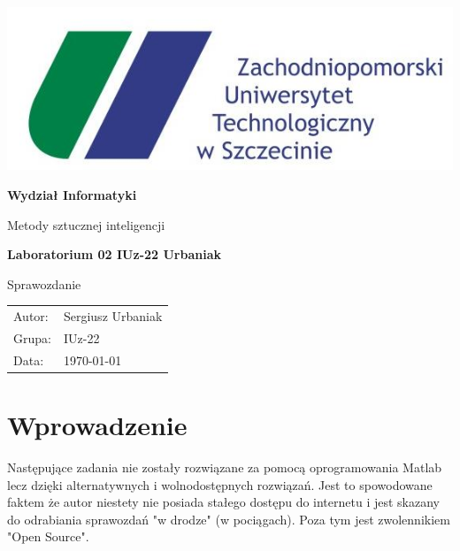 \documentclass[pointlessnumbers, abstracton, headsepline, a4paper]{scrartcl}
\let\myTOC\tableofcontents
\renewcommand\tableofcontents{\myTOC\clearpage\pagenumbering{arabic}}
\begin{document}
\begin{titlepage}

\begin{center}
\includegraphics[scale=0.5]{logos/zut.jpg}
\par
\end{center}

\begin{center}
\textsf{\textbf{\LARGE Wydział Informatyki}}
\end{center}{\LARGE}

\vspace{1.5cm}

\begin{center}
\textsf{\Large Metody sztucznej inteligencji}
\end{center}

\begin{center}
\textsf{\textbf{\Large Laboratorium 02 IUz-22 Urbaniak}}
\end{center}

\begin{center}
\textsf{\large Sprawozdanie}
\end{center}

\vspace{3.5cm}

\begin{center}
\begin{tabular}{ll}
Autor: & Sergiusz Urbaniak\tabularnewline
Grupa: & IUz-22\tabularnewline
Data: & \today\tabularnewline
\end{tabular}
\end{center}

\end{titlepage}

\tableofcontents

\section{Wprowadzenie}
Następujące zadania nie zostały rozwiązane za pomocą oprogramowania Matlab lecz dzięki alternatywnych i wolnodostępnych rozwiązań. Jest to spowodowane faktem że autor niestety nie posiada stałego dostępu do internetu i jest skazany do odrabiania sprawozdań "w drodze" (w pociągach). Poza tym jest zwolennikiem "Open Source".
\end{document}

